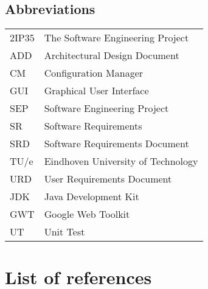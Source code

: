 \subsection{Abbreviations}
\begin{tabular}{l|l}
2IP35 & The Software Engineering Project \\
ADD & Architectural Design Document \\
CM    & Configuration Manager \\
GUI & Graphical User Interface \\
SEP   & Software Engineering Project \\
SR    & Software Requirements \\
SRD   & Software Requirements Document \\
TU/e  & Eindhoven University of Technology \\
URD   & User Requirements Document \\
JDK   & Java Development Kit \\
GWT   & Google Web Toolkit \\
UT    & Unit Test
\end{tabular}

\section{List of references}
